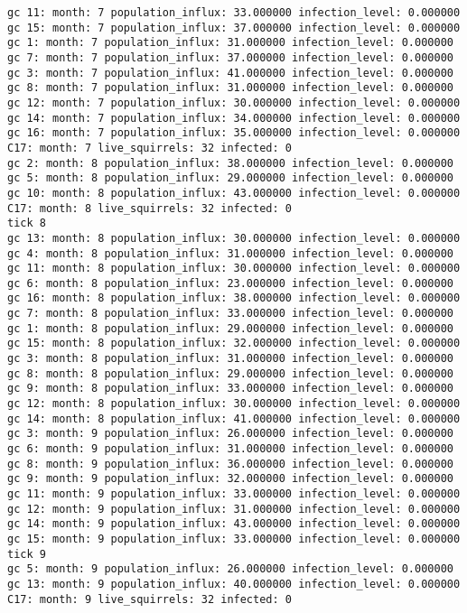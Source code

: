 \begin{lstlisting}[basicstyle=\small]
gc 11: month: 7 population_influx: 33.000000 infection_level: 0.000000
gc 15: month: 7 population_influx: 37.000000 infection_level: 0.000000
gc 1: month: 7 population_influx: 31.000000 infection_level: 0.000000
gc 7: month: 7 population_influx: 37.000000 infection_level: 0.000000
gc 3: month: 7 population_influx: 41.000000 infection_level: 0.000000
gc 8: month: 7 population_influx: 31.000000 infection_level: 0.000000
gc 12: month: 7 population_influx: 30.000000 infection_level: 0.000000
gc 14: month: 7 population_influx: 34.000000 infection_level: 0.000000
gc 16: month: 7 population_influx: 35.000000 infection_level: 0.000000
C17: month: 7 live_squirrels: 32 infected: 0
gc 2: month: 8 population_influx: 38.000000 infection_level: 0.000000
gc 5: month: 8 population_influx: 29.000000 infection_level: 0.000000
gc 10: month: 8 population_influx: 43.000000 infection_level: 0.000000
C17: month: 8 live_squirrels: 32 infected: 0
tick 8
gc 13: month: 8 population_influx: 30.000000 infection_level: 0.000000
gc 4: month: 8 population_influx: 31.000000 infection_level: 0.000000
gc 11: month: 8 population_influx: 30.000000 infection_level: 0.000000
gc 6: month: 8 population_influx: 23.000000 infection_level: 0.000000
gc 16: month: 8 population_influx: 38.000000 infection_level: 0.000000
gc 7: month: 8 population_influx: 33.000000 infection_level: 0.000000
gc 1: month: 8 population_influx: 29.000000 infection_level: 0.000000
gc 15: month: 8 population_influx: 32.000000 infection_level: 0.000000
gc 3: month: 8 population_influx: 31.000000 infection_level: 0.000000
gc 8: month: 8 population_influx: 29.000000 infection_level: 0.000000
gc 9: month: 8 population_influx: 33.000000 infection_level: 0.000000
gc 12: month: 8 population_influx: 30.000000 infection_level: 0.000000
gc 14: month: 8 population_influx: 41.000000 infection_level: 0.000000
gc 3: month: 9 population_influx: 26.000000 infection_level: 0.000000
gc 6: month: 9 population_influx: 31.000000 infection_level: 0.000000
gc 8: month: 9 population_influx: 36.000000 infection_level: 0.000000
gc 9: month: 9 population_influx: 32.000000 infection_level: 0.000000
gc 11: month: 9 population_influx: 33.000000 infection_level: 0.000000
gc 12: month: 9 population_influx: 31.000000 infection_level: 0.000000
gc 14: month: 9 population_influx: 43.000000 infection_level: 0.000000
gc 15: month: 9 population_influx: 33.000000 infection_level: 0.000000
tick 9
gc 5: month: 9 population_influx: 26.000000 infection_level: 0.000000
gc 13: month: 9 population_influx: 40.000000 infection_level: 0.000000
C17: month: 9 live_squirrels: 32 infected: 0

\end{lstlisting}
